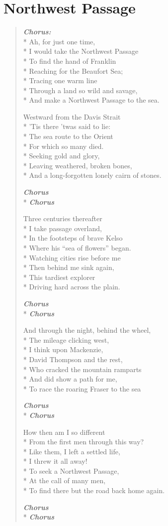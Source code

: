 \documentclass[9pt,twoside]{extarticle}
\makeatletter
\newenvironment{xverse}{
	\begin{verse}
	\fontsize{8.5}{10.5}\selectfont
}{
	\end{verse}
}
\newcommand{\chorusdef}{\textbf{\emph{Chorus:}}\\*}
\newcommand{\chorus@mark}[1][1]{%
\textbf{\emph{Chorus \ifthenelse{\equal{#1}{1}}{}{$\times$ #1}}}%
}
\newcommand{\chorusmark}[1][1]{%
\ifvmode%
\vspace{-0.5\stanzaskip}%
\chorus@mark[#1]%
\vspace{-0.5\stanzaskip}%
\else \\*%
\chorus@mark[#1]%
\fi%
}
\makeatother
\begin{document}
\section{Northwest Passage}

\begin{xverse}
\chorusdef
Ah, for just one time, \\*
I would take the Northwest Passage \\*
To find the hand of Franklin \\*
Reaching for the Beaufort Sea; \\*
Tracing one warm line \\*
Through a land so wild and savage, \\*
And make a Northwest Passage to the sea.

Westward from the Davis Strait \\*
’Tis there ’twas said to lie: \\*
The sea route to the Orient \\*
For which so many died. \\*
Seeking gold and glory, \\*
Leaving weathered, broken bones, \\*
And a long-forgotten lonely cairn of stones.

\chorusmark

Three centuries thereafter \\*
I take passage overland, \\*
In the footsteps of brave Kelso \\*
Where his “sea of flowers” began. \\*
Watching cities rise before me \\*
Then behind me sink again, \\*
This tardiest explorer \\*
Driving hard across the plain.

\chorusmark

And through the night, behind the wheel, \\*
The mileage clicking west, \\*
I think upon Mackenzie, \\*
David Thompson and the rest, \\*
Who cracked the mountain ramparts \\*
And did show a path for me, \\*
To race the roaring Fraser to the sea

\chorusmark

How then am I so different \\*
From the first men through this way? \\*
Like them, I left a settled life, \\*
I threw it all away! \\*
To seek a Northwest Passage, \\*
At the call of many men, \\*
To find there but the road back home again.

\chorusmark
\end{xverse}
\end{document}
